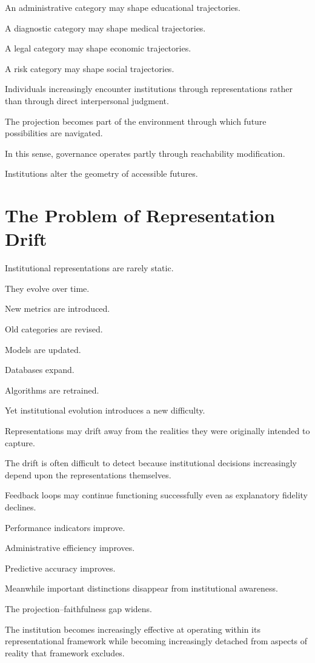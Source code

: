 \documentclass[11pt,oneside,openany]{book}
\begin{document}
An administrative category may shape educational trajectories.

A diagnostic category may shape medical trajectories.

A legal category may shape economic trajectories.

A risk category may shape social trajectories.

Individuals increasingly encounter institutions through representations rather than through direct interpersonal judgment.

The projection becomes part of the environment through which future possibilities are navigated.

In this sense, governance operates partly through reachability modification.

Institutions alter the geometry of accessible futures.

\section{The Problem of Representation Drift}

Institutional representations are rarely static.

They evolve over time.

New metrics are introduced.

Old categories are revised.

Models are updated.

Databases expand.

Algorithms are retrained.

Yet institutional evolution introduces a new difficulty.

Representations may drift away from the realities they were originally intended to capture.

The drift is often difficult to detect because institutional decisions increasingly depend upon the representations themselves.

Feedback loops may continue functioning successfully even as explanatory fidelity declines.

Performance indicators improve.

Administrative efficiency improves.

Predictive accuracy improves.

Meanwhile important distinctions disappear from institutional awareness.

The projection--faithfulness gap widens.

The institution becomes increasingly effective at operating within its representational framework while becoming increasingly detached from aspects of reality that framework excludes.
\end{document}
